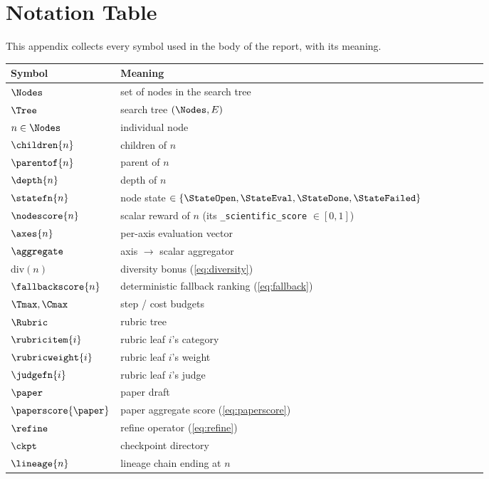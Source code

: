 \section{Notation Table}\label{sec:notation}

This appendix collects every symbol used in the body of the report,
with its meaning.

\begin{longtable}{@{}l p{0.78\linewidth}@{}}
  \toprule
  Symbol & Meaning \\
  \midrule
  $\Nodes$            & set of nodes in the search tree \\
  $\Tree$             & search tree $(\Nodes, E)$ \\
  $n\in\Nodes$        & individual node \\
  $\children{n}$      & children of $n$ \\
  $\parentof{n}$      & parent of $n$ \\
  $\depth{n}$         & depth of $n$ \\
  $\statefn{n}$       & node state $\in\{\StateOpen,\StateEval,\StateDone,\StateFailed\}$ \\
  $\nodescore{n}$     & scalar reward of $n$ (its \texttt{\_scientific\_score} $\in[0,1]$) \\
  $\axes{n}$          & per-axis evaluation vector \\
  $\aggregate$        & axis $\to$ scalar aggregator \\
  $\mathrm{div}(n)$   & diversity bonus (\cref{eq:diversity}) \\
  $\fallbackscore{n}$ & deterministic fallback ranking (\cref{eq:fallback}) \\
  $\Tmax,\Cmax$       & step / cost budgets \\
  $\Rubric$           & rubric tree \\
  $\rubricitem{i}$    & rubric leaf $i$'s category \\
  $\rubricweight{i}$  & rubric leaf $i$'s weight \\
  $\judgefn{i}$       & rubric leaf $i$'s judge \\
  $\paper$            & paper draft \\
  $\paperscore{\paper}$ & paper aggregate score (\cref{eq:paperscore}) \\
  $\refine$           & refine operator (\cref{eq:refine}) \\
  $\ckpt$             & checkpoint directory \\
  $\lineage{n}$       & lineage chain ending at $n$ \\
  \bottomrule
\end{longtable}
